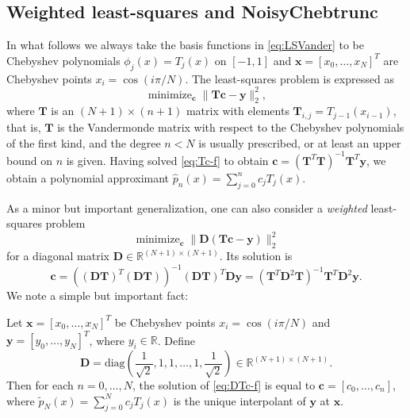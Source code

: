 \documentclass[final,onefignum,onetabnum]{siamart220329}
\def\mainalg{NoisyChebtrunc}
\DeclareMathOperator*{\minimize}{minimize}
\newcommand{\vct}[1]{\bm{#1}}
\newcommand{\mtx}[1]{\bm{#1}}
\newcommand{\T}{\bm{T}}
\begin{document}
\subsection{Weighted least-squares and \mainalg}\label{sec:weight}
In what follows we always take the basis functions in \eqref{eq:LSVander} to be Chebyshev polynomials $\phi_j(x)=T_j(x)$ on $[-1,1]$ and $\vct{x}=[x_0,\ldots,x_N]^T$ are Chebyshev points $x_i = \cos(i\pi/N)$.
The least-squares problem is expressed as  
\begin{equation}  \label{eq:Tc-f}
	\minimize_{\vct{c}} \|\mtx{T}\vct{c}-\vct{y}\|_2^2,
\end{equation}
where $\mtx{T}$ is an $(N+1)\times (n+1)$ matrix with elements $\mtx{T}_{i,j} = T_{j-1}(x_{i-1})$, that is, $\T$ 
is the Vandermonde matrix with respect to the Chebyshev polynomials of the first kind, and the degree $n<N$ is usually prescribed, or at least an upper bound on $n$ is given. 
Having solved \eqref{eq:Tc-f} to obtain 
$\vct{c} = (\mtx{T}^T\mtx{T})^{-1}\mtx{T}^T\vct{y}$, 
we obtain a polynomial approximant $\hat{p}_n(x)=\sum_{j=0}^n c_j T_j(x)$.


As a minor but important generalization, one can also consider a \emph{weighted} least-squares problem 
\begin{equation}  \label{eq:DTc-f}
	\minimize_{\vct{c}} \|\mtx{D}(\T\vct{c}-\vct{y})\|_2^2
\end{equation} 
for a diagonal matrix $\mtx{D} \in \mathbb{R}^{(N+1) \times (N+1)}$. 
Its solution is 
\[
\vct{c}=((\mtx{D} \mtx{T})^T (\mtx{D} \mtx{T}))^{-1} (\mtx{D} \mtx{T})^T \mtx{D} \vct{y}=(\mtx{T}^T \mtx{D}^2 \mtx{T})^{-1} \mtx{T}^T \mtx{D}^2 \vct{y}.
\]
We note a simple but important fact: 

\begin{lemma}\label{lem:equiv}
	Let 
	$\vct{x}=[x_0,\ldots,x_N]^T$ be Chebyshev points $x_i = \cos(i\pi/N)$ and $\vct{y}=[y_0,\ldots,y_N]^T$, where $y_i\in\mathbb{R}$. Define
	\begin{equation}  \label{eq:defD}
		\mtx{D}=\mbox{diag}\left( \frac{1}{\sqrt{2}},1,1,\ldots,1,\frac{1}{\sqrt{2}} \right) \in \mathbb{R}^{(N+1) \times (N+1)}. 
	\end{equation}
	Then for each $n=0,\ldots, N$, the solution of \eqref{eq:DTc-f} is equal to $\vct{c}=[c_0,\ldots,c_n]
	$, where 
	$\tilde p_{N}(x)=\sum_{j=0}^N c_jT_{j}(x)$ is the unique interpolant of $\vct{y}$ at $\vct{x}$. 
\end{lemma}
\end{document}

